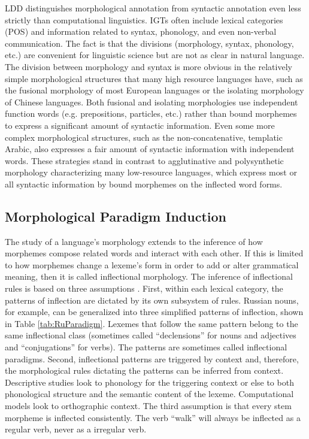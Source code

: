 \documentclass[12pt]{article}
\begin{document}
LDD distinguishes morphological annotation from syntactic annotation even less strictly than computational linguistics. IGTs often include lexical categories (POS) and information related to syntax, phonology, and even non-verbal communication. The fact is that the divisions (morphology, syntax, phonology, etc.) are convenient for linguistic science but are not as clear in natural language. The division between morphology and syntax is more obvious in the relatively simple morphological structures that many high resource languages have, such as the fusional morphology of most European languages or the isolating morphology of Chinese languages. Both fusional and isolating morphologies use independent function words (e.g. prepositions, particles, etc.) rather than bound morphemes to express a significant amount of syntactic information. Even some more complex morphological structures, such as the non-concatenative, templatic Arabic, also expresses a fair amount of syntactic information with independent words. These strategies stand in contrast to agglutinative and polysynthetic morphology characterizing many low-resource languages, which express most or all syntactic information by bound morphemes on the inflected word forms. 

\subsection{Morphological Paradigm Induction}
\label{paradigms}

The study of a language's morphology extends to the inference of how morphemes compose related words and interact with each other. If this is limited to how morphemes change a lexeme's form in order to add or alter grammatical meaning, then it is called inflectional morphology. The inference of inflectional rules is based on three assumptions \cite{durrett_supervised_2013}. First, within each lexical category, the patterns of inflection are dictated by its own subsystem of rules. Russian nouns, for example, can be generalized into three simplified patterns of inflection, shown in Table \ref{tab:RuParadigm}. Lexemes that follow the same pattern belong to the same inflectional class (sometimes called ``declensions'' for nouns and adjectives and ``conjugations'' for verbs). The patterns are sometimes called inflectional paradigms. Second, inflectional patterns are triggered by context and, therefore, the morphological rules dictating the patterns can be inferred from context. Descriptive studies look to phonology for the triggering context or else to both phonological structure and the semantic content of the lexeme. Computational models look to orthographic context. The third assumption is that every stem morpheme is inflected consistently. The verb ``walk'' will always be inflected as a regular verb, never as a irregular verb. 
\end{document}
